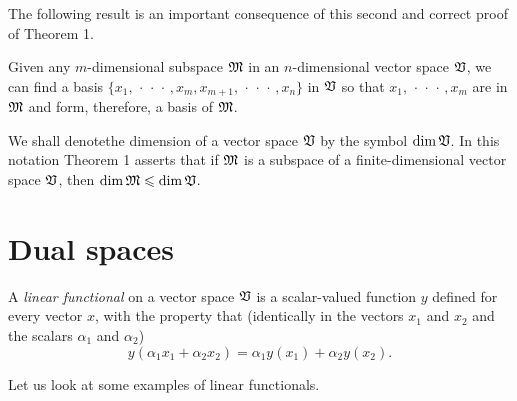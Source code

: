 The following result is an important consequence of this second and correct proof of Theorem 1.

\begin{theorem}
    Given any \(m\)-dimensional subspace \(\mathfrak{M}\) in an \(n\)-dimensional
    vector space \(\mathfrak{V}\), we can find a basis \(\{x_1,
    \,\cdot\,\cdot\,\cdot\,, x_m, x_{m+1}, \,\cdot\,\cdot\,\cdot\,, x_n\}\) in
    \(\mathfrak{V}\) so that \(x_1, \,\cdot\,\cdot\,\cdot\,, x_m\) are in \(\mathfrak{M}\)
    and form, therefore, a basis of \(\mathfrak{M}\).
\end{theorem}

We shall denotethe dimension of a vector space \(\mathfrak{V}\) by the symbol \(\dim
\mathfrak{V}\). In this notation Theorem 1 asserts that if \(\mathfrak{M}\) is a subspace of
a finite-dimensional vector space \(\mathfrak{V}\), then \(\dim \mathfrak{M} \leqslant \dim
\mathfrak{V}\).

\section{Dual spaces}\label{sec-dual-spaces}

\begin{definition}
    A \emph{linear functional} on a vector space \(\mathfrak{V}\) is a scalar-valued
    function \(y\) defined for every vector \(x\), with the property that
    (identically in the vectors \(x_1\) and \(x_2\) and the scalars \(\alpha_1\)
    and \(\alpha_2\))
    \begin{equation*}
        y(\alpha_1 x_1 + \alpha_2 x_2) = \alpha_1 y(x_1) + \alpha_2 y(x_2).
    \end{equation*}
\end{definition}

Let us look at some examples of linear functionals.

